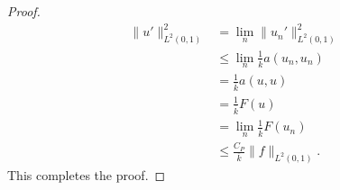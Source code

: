 \documentclass{article}
\begin{document}
\begin{enumerate}
\begin{proof}
\begin{align*}
			      \|u'\|_{L^2(0,1)}^2 & = \lim_n \|u_n'\|_{L^2(0,1)}^2                \\
			                          & \leq \lim_n\frac{1}{\overline k}a(u_n, u_n)   \\
			                          & = \frac{1}{\overline k}a(u,u)                 \\
			                          & = \frac{1}{\overline k}F(u)                   \\
			                          & = \lim_n \frac{1}{\overline k} F(u_n)         \\
			                          & \leq \frac{C_P}{\overline k}\|f\|_{L^2(0,1)}.
		      \end{align*}
		      This completes the proof.
	      \end{proof}
\end{enumerate}
\end{document}
